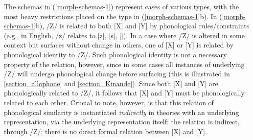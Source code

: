 The schemas in (\ref{morph-schemas-1}) represent cases of various types, with the most heavy restrictions placed on the type in (\ref{morph-schemas-1}b). In (\ref{morph-schemas-1}b), /Z/ is related to both [X] and [Y] by phonological rules/constraints (e.g., in English, /z/ relates to [z], [s], [\@z]).  In a case where /Z/ is altered in some context but surfaces without change in others, one of [X] or [Y] is related by phonological identity to /Z/. Such phonological identity is not a necessary property of the relation, however, since in some cases all instances of  underlying  /Z/ will undergo phonological change before surfacing (this is illustrated in \textsection\ref{section_allophone} and \textsection\ref{section_Kinande}). Since both [X] and [Y] are phonologically related to /Z/, it follows that [X] and [Y] must be phonologically related to each other. Crucial to note, however, is that this relation of phonological similarity is instantiated {\it indirectly} in theories with an underlying representation,  via the underlying representation itself: the relation is indirect, through /Z/; there is no direct formal relation between [X] and [Y]. 



